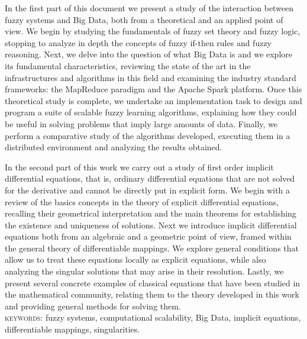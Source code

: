 %
%
%

In the first part of this document we present a study of the interaction between fuzzy systems and Big Data, both from a theoretical and an applied point of view. We begin by studying the fundamentals of fuzzy set theory and fuzzy logic, stopping to analyze in depth the concepts of fuzzy if-then rules and fuzzy reasoning. Next, we delve into the question of what Big Data is and we explore its fundamental characteristics, reviewing the state of the art in the infrastructures and algorithms in this field and examining the industry standard frameworks: the MapReduce paradigm and the Apache Spark platform. Once this theoretical study is complete, we undertake an implementation task to design and program a suite of scalable fuzzy learning algorithms, explaining how they could be useful in solving problems that imply large amounts of data. Finally, we perform a comparative study of the algorithms developed, executing them in a distributed environment and analyzing the results obtained.

In the second part of this work we carry out a study of first order implicit differential equations, that is, ordinary differential equations that are not solved for the derivative and cannot be directly put in explicit form. We begin with a review of the basics concepts in the theory of explicit differential equations, recalling their geometrical interpretation and the main theorems for establishing the existence and uniqueness of solutions. Next we introduce implicit differential equations both from an algebraic and a geometric point of view, framed within the general theory of differentiable mappings. We explore general conditions that allow us to treat these equations locally as explicit equations, while also analyzing the singular solutions that may arise in their resolution. Lastly, we present several concrete examples of classical equations that have been studied in the mathematical community, relating them to the theory developed in this work and providing general methods for solving them.\\


\noindent\textsc{keywords:} fuzzy systems, computational scalability, Big Data, implicit equations, differentiable mappings, singularities.
